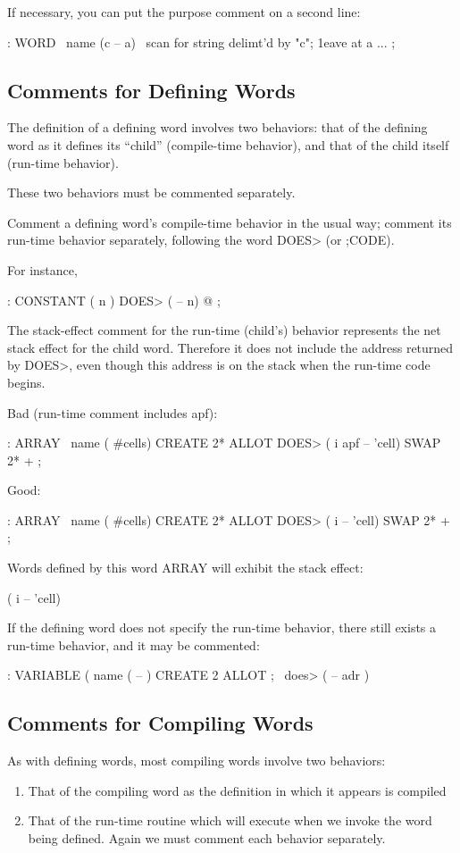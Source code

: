 If necessary, you can put the purpose comment on a second line:
\begin{Code}
: WORD   \   name   (c -- a)
   \ scan for string delimt'd by "c"; 1eave at a
   ... ;
\end{Code}
\subsection{Comments for Defining Words}
The definition of a defining word involves two behaviors:
that of the defining word as it defines its ``child'' (compile-time behavior),
and
that of the child itself (run-time behavior).

These two behaviors must be commented separately.

\begin{tip}
Comment a defining word's compile-time behavior in the usual way; comment
its run-time behavior separately, following the word DOES> (or
;CODE).
\end{tip}

For instance,
\begin{Code}
: CONSTANT   ( n )
   DOES> ( -- n)  @ ;
\end{Code}

The stack-effect comment for the run-time (child's) behavior represents
the net stack effect for the child word.  Therefore it does not include the
address returned by DOES>, even though this address is on the stack
when the run-time code begins.

Bad (run-time comment includes apf):
\begin{Code}
: ARRAY    \  name ( #cells)
   CREATE 2* ALLOT
    DOES>   ( i apf -- 'cell)   SWAP  2* + ;
\end{Code}
Good:
\begin{Code}
: ARRAY \  name ( #cells)
   CREATE 2* ALLOT
    DOES>   ( i -- 'cell)   SWAP  2* + ;
\end{Code}
Words defined by this word ARRAY will exhibit the stack effect:
\begin{Code}
( i -- 'cell)
\end{Code}
If the defining word does not specify the run-time behavior, there still
exists a run-time behavior, and it may be commented:
\begin{Code}
: VARIABLE   ( name ( -- ) CREATE 2 ALLOT ;
   \ does>   ( -- adr )
\end{Code}
\subsection{Comments for Compiling Words}
As with defining words, most compiling words involve two behaviors:
\begin{enumerate}
\item That of the compiling word as the definition in which it appears is compiled
\item That of the run-time routine which will execute when we invoke the word
being defined.  Again we must comment each behavior separately.
\end{enumerate}

